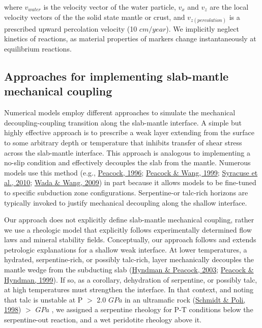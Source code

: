 \documentclass[draft,linenumbers]{agujournal2018}
\begin{document}
where \(v_{water}\) is the velocity vector of the water particle,
\(v_{x}\) and \(v_{z}\) are the local velocity vectors of the the solid
state mantle or crust, and \(v_{z(percolation)}\) is a prescribed upward
percolation velocity (10 \(cm/year\)). We implicitly neglect kinetics of
reactions, as material properties of markers change instantaneously at
equilibrium reactions.

\hypertarget{approaches-for-implementing-slab-mantle-mechanical-coupling}{%
\subsection{Approaches for implementing slab-mantle mechanical
coupling}\label{approaches-for-implementing-slab-mantle-mechanical-coupling}}

Numerical models employ different approaches to simulate the mechanical
decoupling-coupling transition along the slab-mantle interface. A simple
but highly effective approach is to prescribe a weak layer extending
from the surface to some arbitrary depth or temperature that inhibits
transfer of shear stress across the slab-mantle interface. This approach
is analogous to implementing a no-slip condition and effectively
decouples the slab from the mantle. Numerous models use this method
(e.g., \protect\hyperlink{ref-Peacock1996}{Peacock, 1996};
\protect\hyperlink{ref-Peacock1999b}{Peacock \& Wang, 1999};
\protect\hyperlink{ref-Syracuse2010}{Syracuse et al., 2010};
\protect\hyperlink{ref-Wada2009}{Wada \& Wang, 2009}) in part because it
allows models to be fine-tuned to specific subduction zone
configurations. Serpentine-or talc-rich horizons are typically invoked
to justify mechanical decoupling along the shallow interface.

Our approach does not explicitly define slab-mantle mechanical coupling,
rather we use a rheologic model that explicitly follows experimentally
determined flow laws and mineral stability fields. Conceptually, our
approach follows and extends petrologic explanations for a shallow weak
interface. At lower temperatures, a hydrated, serpentine-rich, or
possibly talc-rich, layer mechanically decouples the mantle wedge from
the subducting slab (\protect\hyperlink{ref-Hyndman2003}{Hyndman \&
Peacock, 2003}; \protect\hyperlink{ref-Peacock1999a}{Peacock \& Hyndman,
1999}). If so, as a corollary, dehydration of serpentine, or possibly
talc, at high temperatures must strengthen the interface. In that
context, and noting that talc is unstable at P \(>\) 2.0 \(GPa\) in an
ultramafic rock (\protect\hyperlink{ref-Schmidt1998}{Schmidt \& Poli,
1998}) \(>\) \(GPa\) , we assigned a serpentine rheology for P-T
conditions below the serpentine-out reaction, and a wet peridotite
rheology above it.
\end{document}
